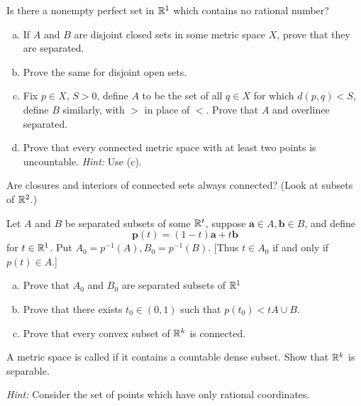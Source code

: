 \begin{myexercise}
    \label{ex:2.18}
    Is there a nonempty perfect set in ${\protect\mathbb R}^1$ which contains no rational number?
\end{myexercise}


\begin{myexercise}
    \label{ex:2.19}
    \begin{enumerate}[(a)]
        \item If $A$ and $B$ are disjoint closed sets in some metric space $X$, prove that they are separated.
        \item Prove the same for disjoint open sets. 
        \item Fix $p \in X$, $S > 0$, define $A$ to be the set of all $q \in X$ for which $d(p, q) < S$, define $B$ similarly, with $>$ in place of $<$. Prove that $A$ and overlinee separated.
        \item Prove that every connected metric space with at least two points is uncountable. \emph{Hint:} Use (c).
    \end{enumerate}
\end{myexercise}

\begin{myexercise}
    \label{ex:2.20}
    Are closures and interiors of connected sets always connected? 
    (Look at subsets of ${\protect\mathbb R}^2$.)
\end{myexercise}

\begin{myexercise}
    \label{ex:2.21}
    Let $A$ and $B$ be separated subsets of some ${\protect\mathbb R}^t$, 
    suppose $\mathbf{a} \in A, \mathbf{b} \in B$,
    and define 
    \begin{equation*}
        \mathbf{p}(t) = (1 - t)\mathbf{a} + t\mathbf{b}
    \end{equation*}
    for $t \in {\protect\mathbb R}^1$. 
    Put $A_0= p^{-1}(A), B_0= p^{-1}(B)$. 
    [Thus $t \in A_0$ if and only if $p(t) \in A$.]
    \begin{enumerate}[(a)]
        \item Prove that $A_0$ and $B_0$ are separated subsets of ${\protect\mathbb R}^1$
        \item Prove that there exists $t_0 \in (0, 1)$ such that $p(t_0) <t A \cup B$.
        \item Prove that every convex subset of ${\protect\mathbb R}^k$ is connected.
    \end{enumerate}
\end{myexercise}

\begin{myexercise}
    \label{ex:2.22}
    A metric space is called  if it contains a countable dense subset. 
    Show that ${\protect\mathbb R}^k$ is separable. 
    
    \emph{Hint:} Consider the set of points which have only rational coordinates.
\end{myexercise}

